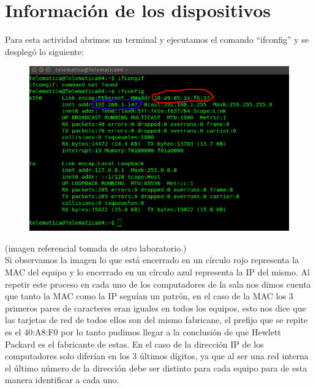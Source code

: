 \documentclass{udpreport}
\begin{document}
	\section{Información de los dispositivos}
		Para esta actividad abrimos un terminal y ejecutamos el comando ``ifconfig'' y se desplegó lo siguiente:\\
		\begin{figure}[h]
    		\centering
    	\includegraphics[width=\textwidth]{Terminal.png}
		\end{figure}
		(imagen referencial tomada de otro laboratorio.)\\
		Si observamos la imagen lo que está encerrado en un círculo rojo representa la MAC del equipo y lo encerrado en un
		círculo azul representa la IP del mismo. Al repetir este proceso en cada uno de los computadores de la sala nos    
		dimos cuenta que tanto la MAC como la IP seguían un patrón, en el caso de la MAC los 3 primeros pares de caracteres
		eran iguales en todos los equipos, esto nos dice que las tarjetas de red de todos ellos son del mismo fabricane,      
		el prefijo que se repite es el 40:A8:F0 por lo tanto pudimos llegar a la conclusión de que Hewlett Packard es el      
		fabricante de estas. En el caso de la dirección IP de los computadores solo diferían en los 3 últimos dígitos, ya     
		que al ser una red interna el último número de la dirección debe ser distinto para cada equipo para de esta manera    
		identificar a cada uno.
\end{document}
